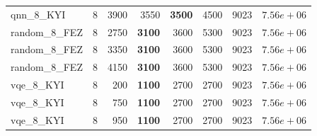 \begin{table}[ht!]
\begin{tabular}{l c r r r r r r}
qnn\_8\_KYI & 8 & 3900 & 3550 & \textbf{3500} & 4500 & 9023 & $7.56e+06$ \\
random\_8\_FEZ & 8 & 2750 & \textbf{3100} & 3600 & 5300 & 9023 & $7.56e+06$ \\
random\_8\_FEZ & 8 & 3350 & \textbf{3100} & 3600 & 5300 & 9023 & $7.56e+06$ \\
random\_8\_FEZ & 8 & 4150 & \textbf{3100} & 3600 & 5300 & 9023 & $7.56e+06$ \\
vqe\_8\_KYI & 8 & 200 & \textbf{1100} & 2700 & 2700 & 9023 & $7.56e+06$ \\
vqe\_8\_KYI & 8 & 750 & \textbf{1100} & 2700 & 2700 & 9023 & $7.56e+06$ \\
vqe\_8\_KYI & 8 & 950 & \textbf{1100} & 2700 & 2700 & 9023 & $7.56e+06$ \\
\bottomrule
\end{tabular}
\end{table}

\clearpage


